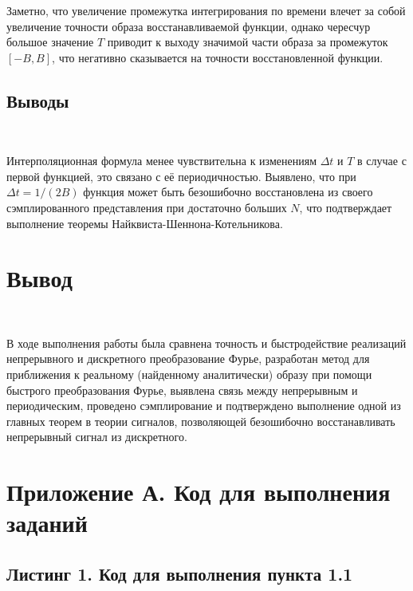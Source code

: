 \documentclass[a4paper]{article}
\begin{document}
Заметно, что увеличение промежутка интегрирования по времени влечет за собой увеличение точности образа восстанавливаемой функции, однако чересчур большое значение $T$ приводит к выходу значимой части образа за промежуток $[-B, B]$, что негативно сказывается на точности восстановленной функции.

\subsection{Выводы}\

Интерполяционная формула менее чувствительна к изменениям $\Delta t$ и $T$ в случае с первой функцией, это связано с её периодичностью. Выявлено, что при $\Delta t = 1/(2B)$ функция может быть безошибочно восстановлена из своего сэмплированного представления при достаточно больших $N$, что подтверждает выполнение теоремы Найквиста-Шеннона-Котельникова.

\section{Вывод}\

В ходе выполнения работы была сравнена точность и быстродействие реализаций непрерывного и дискретного преобразование Фурье, разработан метод для приближения к реальному (найденному аналитически) образу при помощи быстрого преобразования Фурье, выявлена связь между непрерывным и периодическим, проведено сэмплирование и подтверждено выполнение одной из главных теорем в теории сигналов, позволяющей безошибочно восстанавливать непрерывный сигнал из дискретного.

\newpage

\section{Приложение А. Код для выполнения заданий}

\subsection*{Листинг 1. Код для выполнения пункта 1.1}
\end{document}
